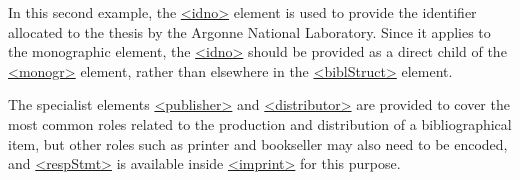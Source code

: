 In this second example, the \hyperref[TEI.idno]{<idno>} element is used to provide the identifier allocated to the thesis by the Argonne National Laboratory. Since it applies to the monographic element, the \hyperref[TEI.idno]{<idno>} should be provided as a direct child of the \hyperref[TEI.monogr]{<monogr>} element, rather than elsewhere in the \hyperref[TEI.biblStruct]{<biblStruct>} element.\par
The specialist elements \hyperref[TEI.publisher]{<publisher>} and \hyperref[TEI.distributor]{<distributor>} are provided to cover the most common roles related to the production and distribution of a bibliographical item, but other roles such as printer and bookseller may also need to be encoded, and \hyperref[TEI.respStmt]{<respStmt>} is available inside \hyperref[TEI.imprint]{<imprint>} for this purpose.\par
